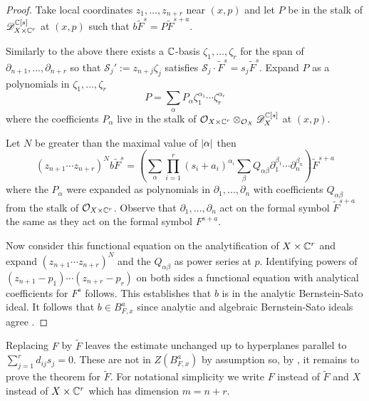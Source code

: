   \begin{proof}
    Take local coordinates $z_1,\ldots, z_{n+r}$ near $(x, p)$ and let $P$ be in the stalk of $\mathscr{D}_{X\times \mathbb{C}^r}^{\mathbb{C}[s]}$ at $(x ,p)$ such that $b \widetilde{F}^s = P \widetilde{F}^{s+a}$.

    Similarly to the above there exists a $\mathbb{C}$-basis $\zeta_1,\ldots,\zeta_r$ for the span of $\partial_{n+1}, \ldots, \partial_{n+r}$ so that $\mathcal{S}_j' := z_{n+j}\zeta_j$ satisfies $\mathcal{S}_j \cdot \widetilde{F}^s = s_{j}\widetilde{F}^s$.
    Expand $P$ as a polynomials in $\zeta_1,\ldots,\zeta_r$
    $$P = \sum_{\alpha} P_\alpha \zeta_{1}^{\alpha_1}\cdots \zeta_{r}^{\alpha_r}$$
    where the coefficients $P_\alpha$ live in the stalk of $\mathcal{O}_{X\times \mathbb{C}^r}\otimes_{\mathcal{O}_{X}}\mathscr{D}_{X}^{\mathbb{C}[s]}$ at $(x,p)$.

    Let $N$ be greater than the maximal value of $\vert \alpha \vert$ then
    $$(z_{n+1}\cdots z_{n+r})^N b \widetilde{F}^s = \left(\sum_{\alpha} \prod_{i=1}^r (s_i + a_i)^{\alpha_i} \sum_\beta Q_{\alpha\beta} \partial_1^{\beta_1}\cdots \partial_n^{\beta_n} \right)\widetilde{F}^{s+a}$$
  where the $P_\alpha$ were expanded as polynomials in $\partial_1,\ldots,\partial_n$ with coefficients $Q_{\alpha\beta}$ from the stalk of $\mathcal{O}_{X\times \mathbb{C}^r}$.
  Observe that $\partial_1,\ldots, \partial_n$ act on the formal symbol $\widetilde{F}^{s+a}$ the same as they act on the formal symbol $F^{s+a}$.

  Now consider this functional equation on the analytification of $X\times \mathbb{C}^r$ and expand $(z_{n+1}\cdots z_{n+r})^N$ and the $Q_{\alpha\beta}$ as power series at $p$.
  Identifying powers of $(z_{n+1}-p_{1})\cdots (z_{n+r} - p_r)$ on both sides a functional equation with analytical coefficients for $F^s$ follows.
  This establishes that $b$ is in the analytic Bernstein-Sato ideal.
  It follows that $ b\in B_{F,x}^a$ since analytic and algebraic Bernstein-Sato ideals agree \cite{brianccon2002remarques}.
  \end{proof}
  Replacing $F$ by $\widetilde{F}$ leaves the estimate unchanged up to hyperplanes parallel to $\sum_{j=1}^r d_{ij}s_j = 0$.
  These are not in $Z(B_{F,x}^a)$ by assumption so, by , it remains to prove the theorem for $\widetilde{F}$.
  For notational simplicity we write $F$ instead of $\widetilde{F}$ and $X$ instead of $X\times \mathbb{C}^r$ which has dimension $m = n + r$.
